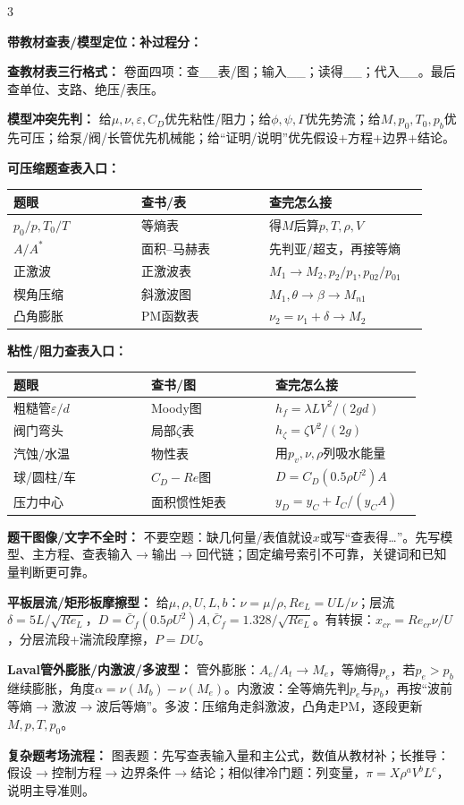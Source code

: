 \documentclass[a4paper]{article}
\newcommand{\sect}[1]{\par{\bfseries\color{Q}#1：}}
\begin{document}
\begin{multicols}{3}
{\sect{带教材查表/模型定位：补过程分}
\sect{查教材表三行格式}
卷面四项：查\_\_表/图；输入\_\_；读得\_\_；代入\_\_。最后查单位、支路、绝压/表压。
\sect{模型冲突先判}
给$\mu,\nu,\varepsilon,C_D$优先粘性/阻力；给$\phi,\psi,\Gamma$优先势流；给$M,p_0,T_0,p_b$优先可压；给泵/阀/长管优先机械能；给“证明/说明”优先假设+方程+边界+结论。
\sect{可压缩题查表入口}
\begin{tabular}{|p{0.29\linewidth}|p{0.29\linewidth}|p{0.34\linewidth}|}\hline
题眼 & 查书/表 & 查完怎么接\\\hline
$p_0/p,T_0/T$ & 等熵表 & 得$M$后算$p,T,\rho,V$\\\hline
$A/A^*$ & 面积--马赫表 & 先判亚/超支，再接等熵\\\hline
正激波 & 正激波表 & $M_1\to M_2,p_2/p_1,p_{02}/p_{01}$\\\hline
楔角压缩 & 斜激波图 & $M_1,\theta\to\beta\to M_{n1}$\\\hline
凸角膨胀 & PM函数表 & $\nu_2=\nu_1+\delta\to M_2$\\\hline
\end{tabular}
\sect{粘性/阻力查表入口}
\begin{tabular}{|p{0.31\linewidth}|p{0.28\linewidth}|p{0.33\linewidth}|}\hline
题眼 & 查书/图 & 查完怎么接\\\hline
粗糙管$\varepsilon/d$ & Moody图 & $h_f=\lambda L V^2/(2gd)$\\\hline
阀门弯头 & 局部$\zeta$表 & $h_\zeta=\zeta V^2/(2g)$\\\hline
汽蚀/水温 & 物性表 & 用$p_v,\nu,\rho$列吸水能量\\\hline
球/圆柱/车 & $C_D-Re$图 & $D=C_D(0.5\rho U^2)A$\\\hline
压力中心 & 面积惯性矩表 & $y_D=y_C+I_C/(y_CA)$\\\hline
\end{tabular}
\sect{题干图像/文字不全时}
不要空题：缺几何量/表值就设$x$或写“查表得…”。先写模型、主方程、查表输入$\to$输出$\to$回代链；固定编号索引不可靠，关键词和已知量判断更可靠。
\sect{平板层流/矩形板摩擦型}
给$\mu,\rho,U,L,b$：$\nu=\mu/\rho,Re_L=UL/\nu$；层流$\delta=5L/\sqrt{Re_L}$，$D=\bar C_f(0.5\rho U^2)A,\bar C_f=1.328/\sqrt{Re_L}$。有转捩：$x_{cr}=Re_{cr}\nu/U$，分层流段+湍流段摩擦，$P=DU$。
\sect{Laval管外膨胀/内激波/多波型}
管外膨胀：$A_e/A_t\to M_e$，等熵得$p_e$，若$p_e>p_b$继续膨胀，角度$\alpha=\nu(M_b)-\nu(M_e)$。内激波：全等熵先判$p_e$与$p_b$，再按“波前等熵$\to$激波$\to$波后等熵”。多波：压缩角走斜激波，凸角走PM，逐段更新$M,p,T,p_0$。
\sect{复杂题考场流程}
图表题：先写查表输入量和主公式，数值从教材补；长推导：假设$\to$控制方程$\to$边界条件$\to$结论；相似律冷门题：列变量，$\pi=X\rho^aV^bL^c$，说明主导准则。

}
\end{multicols}
\end{document}
